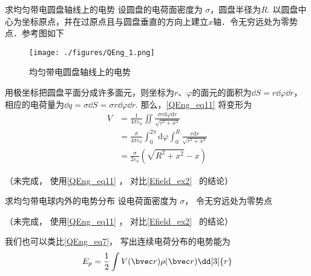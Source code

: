 \begin{example}{求均匀带电圆盘轴线上的电势}
设圆盘的电荷面密度为 $\sigma$，圆盘半径为$R$. 以圆盘中心为坐标原点，并在过原点且与圆盘垂直的方向上建立$x$轴．令无穷远处为零势点．参考图如下
\begin{figure}[ht]
\centering
\texttt{[image: ./figures/QEng\_1.png]}
\caption{均匀带电圆盘轴线上的电势} \label{QEng_fig1}
\end{figure}

用极坐标把圆盘平面分成许多面元，则坐标为$r$、$\varphi$的面元的面积为$\dd S=r\dd \varphi \dd r$，相应的电荷量为$\dd q=\sigma\dd S=\sigma r\dd \varphi \dd r$. 那么，\autoref{QEng_eq11} 将变形为
\begin{equation}
\begin{aligned}
V & = \frac{1}{4 \pi \varepsilon_{0}}\iint \frac{\sigma r \mathrm{d} \varphi \mathrm{d} r}{ \sqrt{r^{2}+x^{2}}} \\ 
& = \frac{\sigma}{4 \pi \varepsilon_{0}} \int_{0}^{2 \pi} \mathrm{d} \varphi \int_{0}^{R} \frac{r \mathrm{d} r}{\sqrt{r^{2}+x^{2}}}\\ 
& = \frac{\sigma}{2 \varepsilon_{0}}\left(\sqrt{R^{2}+x^{2}}-x\right)
\end{aligned}
\end{equation}










（未完成， 使用\autoref{QEng_eq11} ， 对比\autoref{Efield_ex2}~ 的结论）
\end{example}

\begin{example}{求均匀带电球内外的电势分布}
设电荷面密度为 $\sigma$， 令无穷远处为零势点

（未完成， 使用\autoref{QEng_eq11} ， 对比\autoref{Efield_ex2}~ 的结论）
\end{example}

我们也可以类比\autoref{QEng_eq7}， 写出连续电荷分布的电势能为
\begin{equation}\label{QEng_eq8}
E_p = \frac 12 \int V(\bvec r) \rho(\bvec r) \dd[3]{r}
\end{equation}

